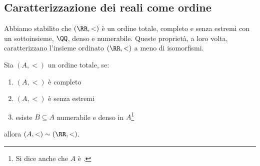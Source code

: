 \subsection{Caratterizzazione dei reali come ordine}
Abbiamo stabilito che $(\RR,<)$ è un ordine totale, completo e senza estremi con un sottoinsieme, $\QQ$, denso e numerabile.
Queste proprietà, a loro volta, caratterizzano l'insieme ordinato $(\RR,<)$ a meno di isomorfismi.

\begin{proposition}[Caratterizzazione di $(\RR,<)$]
	Sia $(A,<)$ un ordine totale, se:
	\begin{enumerate}[1.]
		\item $(A,<)$ è completo
		\item $(A,<)$ è senza estremi
		\item esiste $B \subseteq A$ numerabile e denso in $A$\footnote{Si dice anche che $A$ è .}
	\end{enumerate} 
	allora $(A,<) \sim (\RR,<)$.
\end{proposition}

